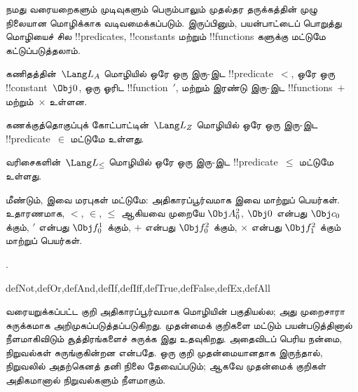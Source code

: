 \documentclass[../../../include/open-logic-section]{subfiles}
\begin{document}
நமது வரையறைகளும் முடிவுகளும் பெரும்பாலும் முதல்தர தருக்கத்தின் முழு நிலையான
மொழிக்காக வடிவமைக்கப்படும். இருப்பினும், பயன்பாட்டைப் பொறுத்து மொழியைச் சில
!!{predicate}s, !!{constant}s மற்றும் !!{function}s களுக்கு மட்டுமே கட்டுப்படுத்தலாம்.

\begin{ex}
கணிதத்தின்~$\Lang L_A$ மொழியில் ஒரே ஒரு இரு-இட !!{predicate}~$<$,
ஒரே ஒரு !!{constant}~$\Obj 0$, ஒரு ஓரிட !!{function}~$\prime$, மற்றும்
இரண்டு இரு-இட !!{function}s~$+$ மற்றும்~$\times$ உள்ளன.
\end{ex}

\begin{ex}
கணக்குத்தொகுப்புக் கோட்பாட்டின்~$\Lang L_Z$ மொழியில் ஒரே ஒரு இரு-இட
!!{predicate}~$\in$ மட்டுமே உள்ளது.
\end{ex}

\begin{ex}
வரிசைகளின்~$\Lang L_\le$ மொழியில் ஒரே ஒரு இரு-இட !!{predicate}~$\le$ மட்டுமே உள்ளது.
\end{ex}

மீண்டும், இவை மரபுகள் மட்டுமே: அதிகாரப்பூர்வமாக இவை மாற்றுப் பெயர்கள்.
உதாரணமாக, $<$, $\in$, $\le$ ஆகியவை முறையே $\Obj A^2_0$,
$\Obj 0$ என்பது $\Obj c_0$ க்கும், $\prime$ என்பது $\Obj f^1_0$ க்கும்,
$+$ என்பது $\Obj f^2_0$ க்கும், $\times$ என்பது $\Obj f^2_1$ க்கும் மாற்றுப் பெயர்கள்.

.

\begin{tagblock}{defNot,defOr,defAnd,defIf,defIff,defTrue,defFalse,defEx,defAll}
\begin{explain}
வரையறுக்கப்பட்ட குறி அதிகாரப்பூர்வமாக மொழியின் பகுதியல்ல; அது முறைசாரா
சுருக்கமாக அறிமுகப்படுத்தப்படுகிறது. முதன்மைக் குறிகளை மட்டும் பயன்படுத்தினால்
நீளமாகிவிடும் சூத்திரங்களைச் சுருக்க இது உதவுகிறது. அதைவிடப் பெரிய நன்மை,
நிறுவல்கள் சுருங்குகின்றன என்பதே. ஒரு குறி முதன்மையானதாக இருந்தால், நிறுவலில்
அதற்கெனத் தனி நிலை தேவைப்படும்; ஆகவே முதன்மைக் குறிகள் அதிகமானால் நிறுவல்களும்
நீளமாகும்.
\end{explain}
\end{tagblock}
\end{document}
